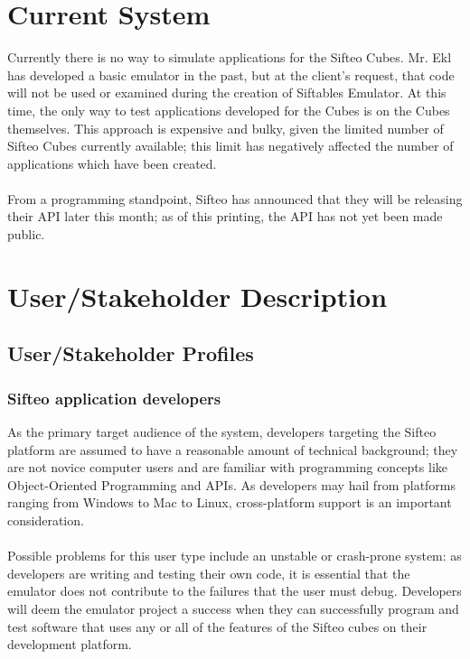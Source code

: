 \documentclass[12pt]{article}
\begin{document}
\section{Current System}
Currently there is no way to simulate applications for the Sifteo Cubes. Mr. Ekl has developed a basic emulator in the past, but at the client's request, that code will not be used or examined during the creation of Siftables Emulator. At this time, the only way to test applications developed for the Cubes is on the Cubes themselves. This approach is expensive and bulky, given the limited number of Sifteo Cubes currently available; this limit has negatively affected the number of applications which have been created.\\\\
From a programming standpoint, Sifteo has announced that they will be releasing their \gls{API} later this month; as of this printing, the \gls{API} has not yet been made public.

\section{User/Stakeholder Description}

               \subsection{User/Stakeholder Profiles}

                          \subsubsection{Sifteo application developers}
                          As the primary target audience of the system, developers targeting the Sifteo platform are assumed to have a reasonable amount of technical background; they are not novice computer users and are familiar with programming concepts like \gls{Object-Oriented Programming} and \gls{API}s. As developers may hail from platforms ranging from \gls{Windows} to \gls{Mac} to \gls{Linux}, \gls{cross-platform support} is an important consideration.\\\\
                          Possible problems for this user type include an unstable or crash-prone system: as developers are writing and testing their own code, it is essential that the emulator does not contribute to the failures that the user must debug. Developers will deem the emulator project a success when they can successfully program and test software that uses any or all of the features of the Sifteo cubes on their development platform.
\end{document}
